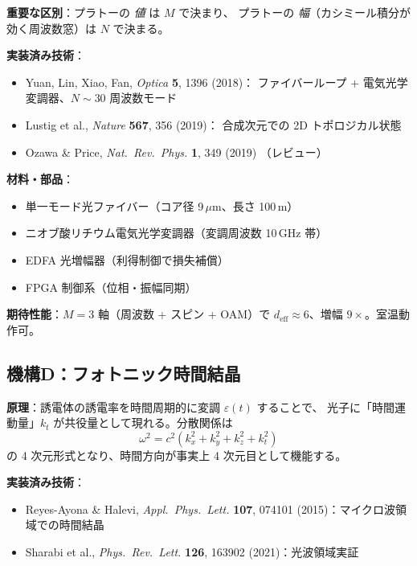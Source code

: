 \documentclass[11pt,a4paper]{article}
\newcommand{\deff}{d_{\mathrm{eff}}}
\begin{document}
\textbf{重要な区別}：プラトーの \emph{値} は $M$ で決まり、
プラトーの \emph{幅}（カシミール積分が効く周波数窓）は $N$ で決まる。

\textbf{実装済み技術}：
\begin{itemize}[leftmargin=2em,nosep]
  \item Yuan, Lin, Xiao, Fan, \textit{Optica} \textbf{5}, 1396 (2018)：
        ファイバーループ + 電気光学変調器、$N\sim 30$ 周波数モード
  \item Lustig et al., \textit{Nature} \textbf{567}, 356 (2019)：
        合成次元での 2D トポロジカル状態
  \item Ozawa \& Price, \textit{Nat.\ Rev.\ Phys.} \textbf{1}, 349 (2019)
        （レビュー）
\end{itemize}

\textbf{材料・部品}：
\begin{itemize}[leftmargin=2em,nosep]
  \item 単一モード光ファイバー（コア径 9\,$\mu$m、長さ 100\,m）
  \item ニオブ酸リチウム電気光学変調器（変調周波数 10\,GHz 帯）
  \item EDFA 光増幅器（利得制御で損失補償）
  \item FPGA 制御系（位相・振幅同期）
\end{itemize}

\textbf{期待性能}：$M=3$ 軸（周波数 + スピン + OAM）で
$\deff \approx 6$、増幅 $9\times$。室温動作可。

\subsection{機構D：フォトニック時間結晶}
\label{sec:time_crystal}

\textbf{原理}：誘電体の誘電率を時間周期的に変調 $\varepsilon(t)$ することで、
光子に「時間運動量」$k_t$ が共役量として現れる。分散関係は
\[
\omega^2 = c^2(k_x^2 + k_y^2 + k_z^2 + k_t^2)
\]
の 4 次元形式となり、時間方向が事実上 4 次元目として機能する。

\textbf{実装済み技術}：
\begin{itemize}[leftmargin=2em,nosep]
  \item Reyes-Ayona \& Halevi, \textit{Appl.\ Phys.\ Lett.}
        \textbf{107}, 074101 (2015)：マイクロ波領域での時間結晶
  \item Sharabi et al., \textit{Phys.\ Rev.\ Lett.}
        \textbf{126}, 163902 (2021)：光波領域実証
\end{itemize}
\end{document}
